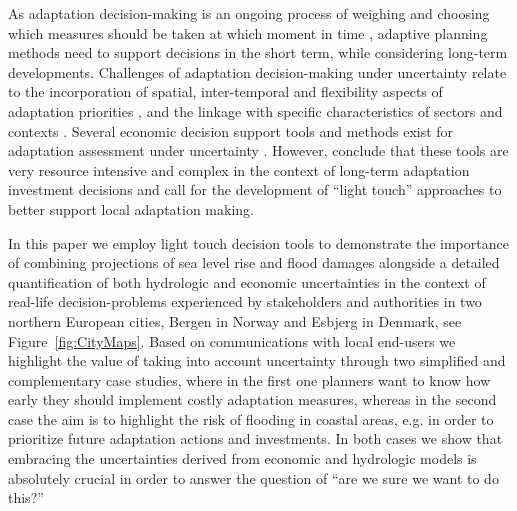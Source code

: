 \documentclass[draft,linenumbers]{agujournal}
\begin{document}
As adaptation decision-making is an ongoing process of weighing and choosing which measures should be taken at which moment in time \citep{Hallegatte&2012}, adaptive planning methods need to support decisions in the short term, while considering long-term developments. Challenges of adaptation decision-making under uncertainty relate to the incorporation of spatial, inter-temporal and flexibility aspects of adaptation priorities \citep{FankhauserSoare2013}, and the linkage with specific characteristics of sectors and contexts \citep{BisaroSwartHinkel2016, HinkelBisaro2016}. Several economic decision support tools and methods exist for adaptation assessment under uncertainty \citep[e.g.][]{Chambwera&2014, WilbyDessai2010, WalkerHaasnootKwakkel2013}. However, \citet{Watkiss&2015} conclude that these tools are very resource intensive and complex in the context of long-term adaptation investment decisions and call for the development of ``light touch'' approaches to better support local adaptation making.

In this paper we employ light touch decision tools to demonstrate the importance of combining projections of sea level rise and flood damages alongside a detailed quantification of both hydrologic and economic uncertainties in the context of real-life decision-problems experienced by stakeholders and authorities in two northern European cities, Bergen in Norway and Esbjerg in Denmark, see Figure~\ref{fig:CityMaps}. Based on communications with local end-users we highlight the value of taking into account uncertainty through two simplified and complementary case studies, where in the first one  planners want to know how early they should implement costly adaptation measures, whereas in the second case the aim is to highlight the risk of flooding in coastal areas, e.g. in order to prioritize future adaptation actions and investments. In both cases we show that embracing the uncertainties derived from economic and hydrologic models is absolutely crucial in order to answer the question of ``are we sure we want to do this?''
\end{document}
